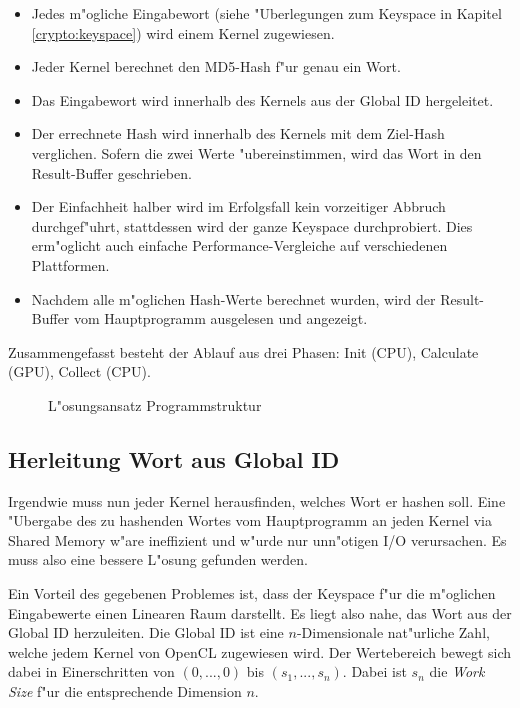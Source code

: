 \begin{refsection}
\begin{itemize}
	\item Jedes m"ogliche Eingabewort (siehe "Uberlegungen zum Keyspace in Kapitel
		\ref{crypto:keyspace}) wird einem Kernel zugewiesen.
	\item Jeder Kernel berechnet den MD5-Hash f"ur genau ein Wort.
	\item Das Eingabewort wird innerhalb des Kernels aus der Global ID
		hergeleitet.
	\item Der errechnete Hash wird innerhalb des Kernels mit dem Ziel-Hash
		verglichen. Sofern die zwei Werte "ubereinstimmen, wird das Wort in den
		Result-Buffer geschrieben.
	\item Der Einfachheit halber wird im Erfolgsfall kein vorzeitiger Abbruch
		durchgef"uhrt, stattdessen wird der ganze Keyspace durchprobiert. Dies
		erm"oglicht auch einfache Performance-Vergleiche auf verschiedenen
		Plattformen.
	\item Nachdem alle m"oglichen Hash-Werte berechnet wurden, wird der
		Result-Buffer vom Hauptprogramm ausgelesen und angezeigt.
\end{itemize}

\noindent Zusammengefasst besteht der Ablauf aus drei Phasen: Init (CPU),
Calculate (GPU), Collect (CPU).

\begin{figure}[H]
	\centering
	
	\caption{L"osungsansatz Programmstruktur}
	\label{img:crypto:programm-struktur}
\end{figure}

\subsection{Herleitung Wort aus Global ID}

Irgendwie muss nun jeder Kernel herausfinden, welches Wort er hashen soll. Eine
"Ubergabe des zu hashenden Wortes vom Hauptprogramm an jeden Kernel via Shared
Memory w"are ineffizient und w"urde nur unn"otigen I/O verursachen. Es muss also
eine bessere L"osung gefunden werden.

Ein Vorteil des gegebenen Problemes ist, dass der Keyspace f"ur die m"oglichen
Eingabewerte einen Linearen Raum darstellt. Es liegt also nahe, das Wort aus der
Global ID herzuleiten. Die Global ID ist eine $n$-Dimensionale nat"urliche Zahl,
welche jedem Kernel von OpenCL zugewiesen wird. Der Wertebereich bewegt sich
dabei in Einerschritten von $(0, ..., 0)$ bis $(s_1, ..., s_n)$. Dabei ist $s_n$
die \textit{Work Size} f"ur die entsprechende Dimension $n$.


\end{refsection}
